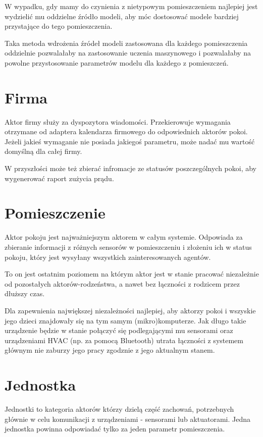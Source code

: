 W wypadku, gdy mamy do czynienia z nietypowym pomieszczeniem najlepiej jest wydzielić mu oddzielne źródło modeli, aby móc dostosować modele bardziej przystające do tego pomieszczenia. 



Taka metoda wdrożenia źródeł modeli zastosowana dla każdego pomieszczenia oddzielnie pozwalałaby na zastosowanie uczenia maszynowego i pozwalałaby na powolne przystosowanie parametrów modelu dla każdego z pomieszczeń. 



\section{Firma}
Aktor firmy służy za dyspozytora wiadomości. Przekierowuje wymagania otrzymane od adaptera kalendarza firmowego do odpowiednich aktorów pokoi.
Jeżeli jakieś wymaganie nie posiada jakiegoś parametru, może nadać mu wartość domyślną dla całej firmy.

W przyszłości może też zbierać infromacje ze statusów poszczególnych pokoi, aby wygenerować raport zużycia prądu.

\section{Pomieszczenie}
Aktor pokoju jest najważniejszym aktorem w całym systemie. 
Odpowiada za zbieranie informacji z różnych sensorów w pomieszczeniu i złożeniu ich w status pokoju, który jest wysyłany wszystkich zainteresowanych agentów.

To on jest ostatnim poziomem na którym aktor jest w stanie pracować niezależnie od pozostałych aktorów-rodzeństwa, a nawet bez łączności z rodzicem przez dłuższy czas. 

Dla zapewnienia największej niezależności najlepiej, aby aktorzy pokoi i wszyskie jego dzieci znajdowały się na tym samym (mikro)komputerze. Jak długo takie urządzenie będzie w stanie połączyć się podlegającymi mu sensorami oraz urządzeniami HVAC (np. za pomocą Bluetooth) utrata łączności z systemem głównym nie zaburzy jego pracy zgodznie z jego aktualnym stanem.


\section{Jednostka} 
Jednostki to kategoria aktorów którzy dzielą część zachowań, potrzebnych głównie w celu komunikacji z urządzeniami - sensorami lub aktuatorami. Jedna jednostka powinna odpowiadać tylko za jeden parametr pomieszczenia. 

